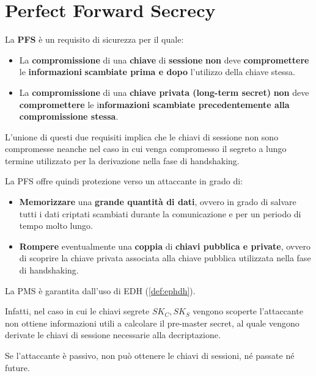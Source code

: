 \section{Perfect Forward Secrecy}
La \textbf{PFS} è un requisito di sicurezza per il quale:
\begin{definition}\label{def:pfs}
\begin{itemize}
    \item La \textbf{compromissione} di una \textbf{chiave} di \textbf{sessione} \textbf{non} deve \textbf{compromettere} le \textbf{informazioni}\textbf{ scambiate prima e dopo} l'utilizzo della chiave stessa.
    \item La \textbf{compromissione} di una \textbf{chiave privata (long-term secret)} \textbf{non} deve \textbf{compromettere} le i\textbf{nformazioni scambiate precedentemente alla compromissione stessa}.
\end{itemize}
\end{definition}
\begin{remark}
L’unione di questi due requisiti implica che le chiavi di sessione non sono compromesse neanche nel caso in cui venga compromesso il segreto a lungo termine utilizzato per la derivazione nella fase di handshaking.
\end{remark}
La PFS offre quindi protezione verso un attaccante in grado di:
\begin{itemize}
    \item \textbf{Memorizzare} una \textbf{grande quantità di dati}, ovvero in grado di salvare tutti i dati criptati scambiati durante la comunicazione e per un periodo di tempo molto lungo.
    \item \textbf{Rompere} eventualmente una \textbf{coppia} di \textbf{chiavi pubblica e private}, ovvero di scoprire la chiave privata associata alla chiave pubblica utilizzata nella fase di handshaking.
\end{itemize}
\begin{theorem}
La PMS è garantita dall'uso di EDH (\cref{def:ephdh}).
\end{theorem}
 Infatti, nel caso in cui le chiavi segrete $SK_C, SK_S$ vengono scoperte l’attaccante non ottiene informazioni utili a calcolare il pre-master secret, al quale vengono derivate le chiavi di sessione necessarie alla decriptazione.
\begin{remark}
Se l'attaccante è passivo, non può ottenere le chiavi di sessioni, né passate né future.
\end{remark}
